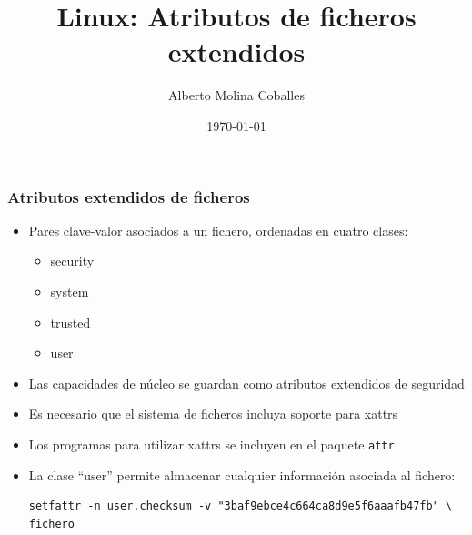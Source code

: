 \documentclass[aspectratio=169]{beamer}
\author{Alberto Molina Coballes}
\title{Linux: Atributos de ficheros extendidos}
\institute{IES Gonzalo Nazareno}
\date{\today}
\begin{document}
\def\braces#1{[#1]}

\begin{frame}[t,plain]
\titlepage
\end{frame}

\begin{frame}[fragile]
  \frametitle{Atributos extendidos de ficheros}
  \begin{itemize}
  \item Pares clave-valor asociados a un fichero, ordenadas en cuatro clases:
    \begin{itemize}
    \item security
    \item system
    \item trusted
    \item user
    \end{itemize}
  \item Las capacidades de núcleo se guardan como atributos extendidos de seguridad
  \item Es necesario que el sistema de ficheros incluya soporte para xattrs
  \item Los programas para utilizar xattrs se incluyen en el paquete \texttt{attr}
  \item La clase ``user'' permite almacenar cualquier información asociada al fichero:
    \begin{lstlisting}
setfattr -n user.checksum -v "3baf9ebce4c664ca8d9e5f6aaafb47fb" \
fichero
    \end{lstlisting}
  \end{itemize}
\end{frame}
\end{document}
